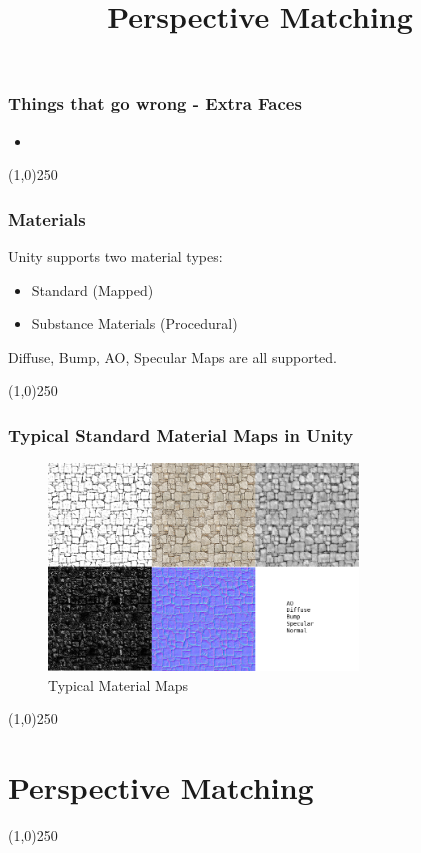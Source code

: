 \begin{frame}
\frametitle{Things that go wrong - Extra Faces}
\begin{figure}
	\centering
	\caption[]{}
	\label{fig:}
\end{figure}
\begin{itemize}
	\item 
\end{itemize}
\end{frame}
\begin{center}\line(1,0){250}\end{center}


\begin{frame}
\frametitle{Materials}
Unity supports two material types:
\begin{itemize}
	\item Standard (Mapped)
	\item Substance Materials (Procedural)
\end{itemize}
Diffuse, Bump, AO, Specular Maps are all supported.
\end{frame}
\begin{center}\line(1,0){250}\end{center}


\begin{frame}
\frametitle{Typical Standard Material Maps in Unity}
\begin{figure}
	\centering
	\includegraphics[height=5.5cm]{./img/Unity/Materials.jpg}
	\caption[Typical Material Maps]{Typical Material Maps}
	\label{fig:}
\end{figure}
\end{frame}
\begin{center}\line(1,0){250}\end{center}




\section{Perspective Matching}
\begin{frame}
	\title[Perspective Matching]{Perspective Matching}
	\titlepage
\end{frame}\begin{center}\line(1,0){250}\end{center}


